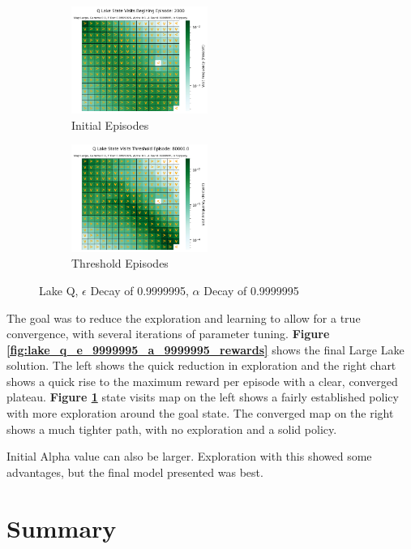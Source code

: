 \documentclass[letterpaper]{article} %
\begin{document}
\begin{figure}[!htb]
	\begin{subfigure}[b]{0.25\textwidth}
		\centering
		\includegraphics[width=1.75in]{Figures/Q_Lake_State_Visits_Begining_Episode__2000_Map_Large__Gamma_0_9__E_Dec_0_9999995__Alpha_0_1__A_Dec_0_9999995__Is_Slippery.png}
		\caption{Initial Episodes}
  	\end{subfigure}%
	\begin{subfigure}[b]{0.25\textwidth}
		\centering
		\includegraphics[width=1.75in]{Figures/Q_Lake_State_Visits_Threshold_Episode__80000_0_Map_Large__Gamma_0_9__E_Dec_0_9999995__Alpha_0_1__A_Dec_0_9999995__Is_Slippery.png}
		\caption{Threshold Episodes}
  	\end{subfigure}%
\caption{Lake Q,  $\epsilon$ Decay of 0.9999995, $\alpha$ Decay of 0.9999995}
\label{fig:lake_q_e_9999995_a_9999995_maps}
\end{figure}

The goal was to reduce the exploration and learning to allow for a true convergence, with several iterations of parameter tuning. \textbf{Figure \ref{fig:lake_q_e_9999995_a_9999995_rewards}} shows the final Large Lake solution.  The left shows the quick reduction in exploration and the right chart shows a quick rise to the maximum reward per episode with a clear, converged plateau.  \textbf{Figure \ref{fig:lake_q_e_9999995_a_9999995_maps}} state visits map on the left shows a fairly established policy with more exploration around the goal state.  The converged map on the right shows a much tighter path, with no exploration and a solid policy.


Initial Alpha value can also be larger.  Exploration with this showed some advantages, but the final model presented was best.

\section{Summary}
\end{document}
